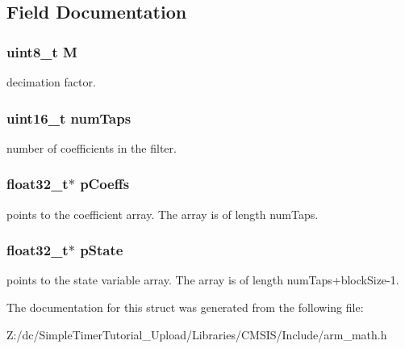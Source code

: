 \subsection{Field Documentation}
\hypertarget{structarm__fir__decimate__instance__f32_ae2c8107d00d3c9942e7a20fc598edecf}{
\subsubsection[{M}]{\setlength{\rightskip}{0pt plus 5cm}uint8\-\_\-t M}}\label{structarm__fir__decimate__instance__f32_ae2c8107d00d3c9942e7a20fc598edecf}
decimation factor. \hypertarget{structarm__fir__decimate__instance__f32_a751941891e47f522a7f5375fe8990aac}{
\subsubsection[{num\-Taps}]{\setlength{\rightskip}{0pt plus 5cm}uint16\-\_\-t num\-Taps}}\label{structarm__fir__decimate__instance__f32_a751941891e47f522a7f5375fe8990aac}
number of coefficients in the filter. \hypertarget{structarm__fir__decimate__instance__f32_aacbb8dd8eeba4b21fc2bb40076405ee3}{
\subsubsection[{p\-Coeffs}]{\setlength{\rightskip}{0pt plus 5cm}float32\-\_\-t$\ast$ p\-Coeffs}}\label{structarm__fir__decimate__instance__f32_aacbb8dd8eeba4b21fc2bb40076405ee3}
points to the coefficient array. The array is of length num\-Taps. \hypertarget{structarm__fir__decimate__instance__f32_a335c87e6fdc4b96601d95a5de8b9c463}{
\subsubsection[{p\-State}]{\setlength{\rightskip}{0pt plus 5cm}float32\-\_\-t$\ast$ p\-State}}\label{structarm__fir__decimate__instance__f32_a335c87e6fdc4b96601d95a5de8b9c463}
points to the state variable array. The array is of length num\-Taps+block\-Size-\/1. 

The documentation for this struct was generated from the following file\-:\begin{DoxyCompactItemize}
\item 
Z\-:/dc/\-Simple\-Timer\-Tutorial\-\_\-\-Upload/\-Libraries/\-C\-M\-S\-I\-S/\-Include/arm\-\_\-math.\-h\end{DoxyCompactItemize}
